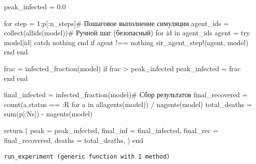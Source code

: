 \documentclass[
  12pt,
  a4paper,
  DIV=11,
  numbers=noendperiod]{scrreprt}
\newenvironment{Shaded}{\begin{snugshade}}{\end{snugshade}}
\newcommand{\CommentTok}[1]{\textcolor[rgb]{0.37,0.37,0.37}{#1}}
\newcommand{\ConstantTok}[1]{\textcolor[rgb]{0.56,0.35,0.01}{#1}}
\newcommand{\ControlFlowTok}[1]{\textcolor[rgb]{0.00,0.23,0.31}{#1}}
\newcommand{\FloatTok}[1]{\textcolor[rgb]{0.68,0.00,0.00}{#1}}
\newcommand{\FunctionTok}[1]{\textcolor[rgb]{0.28,0.35,0.67}{#1}}
\newcommand{\KeywordTok}[1]{\textcolor[rgb]{0.00,0.23,0.31}{#1}}
\newcommand{\NormalTok}[1]{\textcolor[rgb]{0.00,0.23,0.31}{#1}}
\newcommand{\OperatorTok}[1]{\textcolor[rgb]{0.37,0.37,0.37}{#1}}
\begin{document}
\begin{Shaded}
\begin{Highlighting}[]
\NormalTok{    peak\_infected }\OperatorTok{=} \FloatTok{0.0}

    \ControlFlowTok{for}\NormalTok{ step }\OperatorTok{=} \FloatTok{1}\OperatorTok{:}\NormalTok{p[}\OperatorTok{:}\NormalTok{n\_steps]}\CommentTok{\# Пошаговое выполнение симуляции}
\NormalTok{        agent\_ids }\OperatorTok{=} \FunctionTok{collect}\NormalTok{(}\FunctionTok{allids}\NormalTok{(model))}\CommentTok{\# Ручной шаг (безопасный)}
        \ControlFlowTok{for}\NormalTok{ id }\KeywordTok{in}\NormalTok{ agent\_ids}
\NormalTok{            agent }\OperatorTok{=} \ControlFlowTok{try}
\NormalTok{                model[id]}
            \ControlFlowTok{catch}
                \ConstantTok{nothing}
            \ControlFlowTok{end}
            \ControlFlowTok{if}\NormalTok{ agent }\OperatorTok{!==} \ConstantTok{nothing}
                \FunctionTok{sir\_agent\_step!}\NormalTok{(agent, model)}
            \ControlFlowTok{end}
        \ControlFlowTok{end}

\NormalTok{        frac }\OperatorTok{=} \FunctionTok{infected\_fraction}\NormalTok{(model)}
        \ControlFlowTok{if}\NormalTok{ frac }\OperatorTok{\textgreater{}}\NormalTok{ peak\_infected}
\NormalTok{            peak\_infected }\OperatorTok{=}\NormalTok{ frac}
        \ControlFlowTok{end}
    \ControlFlowTok{end}

\NormalTok{    final\_infected }\OperatorTok{=} \FunctionTok{infected\_fraction}\NormalTok{(model)}\CommentTok{\# Сбор результатов}
\NormalTok{    final\_recovered }\OperatorTok{=} \FunctionTok{count}\NormalTok{(a.status }\OperatorTok{==} \OperatorTok{:}\NormalTok{R }\ControlFlowTok{for}\NormalTok{ a }\KeywordTok{in} \FunctionTok{allagents}\NormalTok{(model)) }\OperatorTok{/} \FunctionTok{nagents}\NormalTok{(model)}
\NormalTok{    total\_deaths }\OperatorTok{=} \FunctionTok{sum}\NormalTok{(p[}\OperatorTok{:}\NormalTok{Ns]) }\OperatorTok{{-}} \FunctionTok{nagents}\NormalTok{(model)}

    \ControlFlowTok{return}\NormalTok{ (}
\NormalTok{        peak }\OperatorTok{=}\NormalTok{ peak\_infected,}
\NormalTok{        final\_inf }\OperatorTok{=}\NormalTok{ final\_infected,}
\NormalTok{        final\_rec }\OperatorTok{=}\NormalTok{ final\_recovered,}
\NormalTok{        deaths }\OperatorTok{=}\NormalTok{ total\_deaths,}
\NormalTok{    )}
\ControlFlowTok{end}
\end{Highlighting}
\end{Shaded}

\begin{verbatim}
run_experiment (generic function with 1 method)
\end{verbatim}
\end{document}
